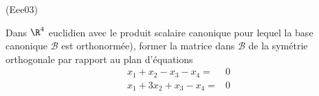 \begin{tiny}(Eee03)\end{tiny}
Dans $\R^{4}$ euclidien avec le produit scalaire canonique pour lequel la base canonique $\mathcal{B}$ est orthonorm{\'e}e), former la matrice dans $\mathcal{B}$ de la sym{\'e}trie orthogonale par
rapport au plan d'{\'e}quations
\begin{align*}
x_{1}+x_{2}-x_{3}-x_{4} =& 0 \\
x_{1}+3x_{2}+x_{3}-x_{4} =& 0
\end{align*}
